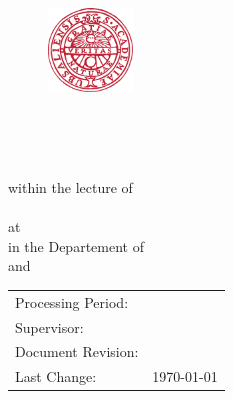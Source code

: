 
\begin{titlepage}


\begin{figure}
	\raggedright
	\includegraphics[width=0.2\textwidth]{./fig/uppsla_university.png}
\end{figure}


\begin{center}
	\vspace*{0pt}
	\begin{Huge}
		\textbf{\mytitle}\\
	\end{Huge}
	\vspace*{4em}
	\begin{LARGE}
		\textbf{\MakeUppercase{\mytypeofwork}}\\
	\end{LARGE}	
	\vspace*{2em}
	within the lecture of\\
	\mycourse\\
	\vspace*{2em}
	at \myuniversity\\
	in the Departement of \mydepartement\\
	\vspace*{2em}
	\myauthora{} and \myauthorb{}\\
	\vspace*{2em}
	\vspace*{3em}
	\vfill
	
	\setlength{\tabcolsep}{24pt}	%
	\begin{tabular}{ll}
		Processing Period:&  \myperiod\\
		Supervisor:&\mytutor\\
		Document Revision:& \myrev\\
		Last Change:& \today\\
	\end{tabular}
	\setlength{\tabcolsep}{6pt}		%
	\restoregeometry
\end{center}
\end{titlepage}
\clearpage


